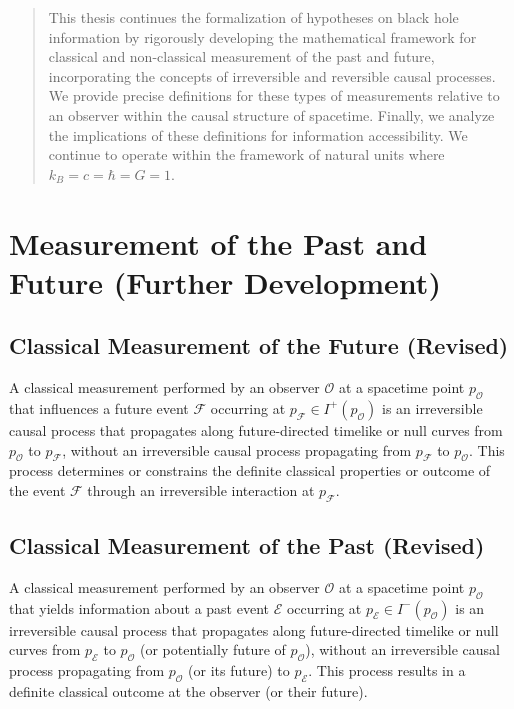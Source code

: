 	
	
	\begin{abstract}
		This thesis continues the formalization of hypotheses on black hole information by rigorously developing the mathematical framework for classical and non-classical measurement of the past and future, incorporating the concepts of irreversible and reversible causal processes. We provide precise definitions for these types of measurements relative to an observer within the causal structure of spacetime. Finally, we analyze the implications of these definitions for information accessibility. We continue to operate within the framework of natural units where $k_B = c = \hbar = G = 1$.
	\end{abstract}
	
	\section{Measurement of the Past and Future (Further Development)}
	
	\subsection{Classical Measurement of the Future (Revised)}
	
	\begin{definition}
		A classical measurement performed by an observer $\mathcal{O}$ at a spacetime point $p_{\mathcal{O}}$ that influences a future event $\mathcal{F}$ occurring at $p_{\mathcal{F}} \in I^+(p_{\mathcal{O}})$ is an irreversible causal process that propagates along future-directed timelike or null curves from $p_{\mathcal{O}}$ to $p_{\mathcal{F}}$, without an irreversible causal process propagating from $p_{\mathcal{F}}$ to $p_{\mathcal{O}}$. This process determines or constrains the definite classical properties or outcome of the event $\mathcal{F}$ through an irreversible interaction at $p_{\mathcal{F}}$.
	\end{definition}
	
	\subsection{Classical Measurement of the Past (Revised)}
	
	\begin{definition}
		A classical measurement performed by an observer $\mathcal{O}$ at a spacetime point $p_{\mathcal{O}}$ that yields information about a past event $\mathcal{E}$ occurring at $p_{\mathcal{E}} \in I^-(p_{\mathcal{O}})$ is an irreversible causal process that propagates along future-directed timelike or null curves from $p_{\mathcal{E}}$ to $p_{\mathcal{O}}$ (or potentially future of $p_{\mathcal{O}}$), without an irreversible causal process propagating from $p_{\mathcal{O}}$ (or its future) to $p_{\mathcal{E}}$. This process results in a definite classical outcome at the observer (or their future).
	\end{definition}
	
